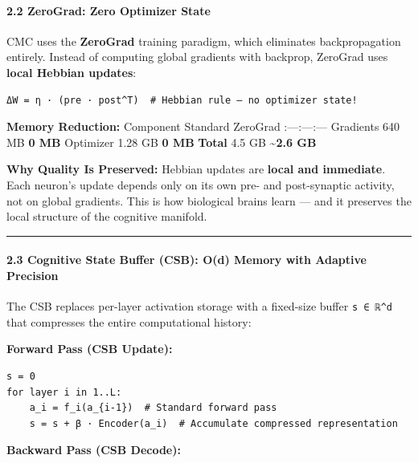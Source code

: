 \documentclass[
  11pt,
  a4paper,
]{article}
\begin{document}
\paragraph{2.2 ZeroGrad: Zero Optimizer
State}\label{zerograd-zero-optimizer-state}

CMC uses the \textbf{ZeroGrad} training paradigm, which eliminates
backpropagation entirely. Instead of computing global gradients with
backprop, ZeroGrad uses \textbf{local Hebbian updates}:

\begin{verbatim}
ΔW = η · (pre · post^T)  # Hebbian rule — no optimizer state!
\end{verbatim}

\textbf{Memory Reduction:} \textbar{} Component \textbar{} Standard
\textbar{} ZeroGrad \textbar{}
\textbar:---\textbar:---\textbar:---\textbar{} \textbar{} Gradients
\textbar{} 640 MB \textbar{} \textbf{0 MB} \textbar{} \textbar{}
Optimizer \textbar{} 1.28 GB \textbar{} \textbf{0 MB} \textbar{}
\textbar{} \textbf{Total} \textbar{} 4.5 GB \textbar{}
\textbf{\textasciitilde2.6 GB} \textbar{}

\textbf{Why Quality Is Preserved:} Hebbian updates are \textbf{local and
immediate}. Each neuron's update depends only on its own pre- and
post-synaptic activity, not on global gradients. This is how biological
brains learn --- and it preserves the local structure of the cognitive
manifold.

\begin{center}\rule{0.5\linewidth}{0.5pt}\end{center}

\paragraph{2.3 Cognitive State Buffer (CSB): O(d) Memory with Adaptive
Precision}\label{cognitive-state-buffer-csb-od-memory-with-adaptive-precision}

The CSB replaces per-layer activation storage with a fixed-size buffer
\texttt{s\ ∈\ ℝ\^{}d} that compresses the entire computational history:

\textbf{Forward Pass (CSB Update):}

\begin{verbatim}
s = 0
for layer i in 1..L:
    a_i = f_i(a_{i-1})  # Standard forward pass
    s = s + β · Encoder(a_i)  # Accumulate compressed representation
\end{verbatim}

\textbf{Backward Pass (CSB Decode):}
\end{document}
